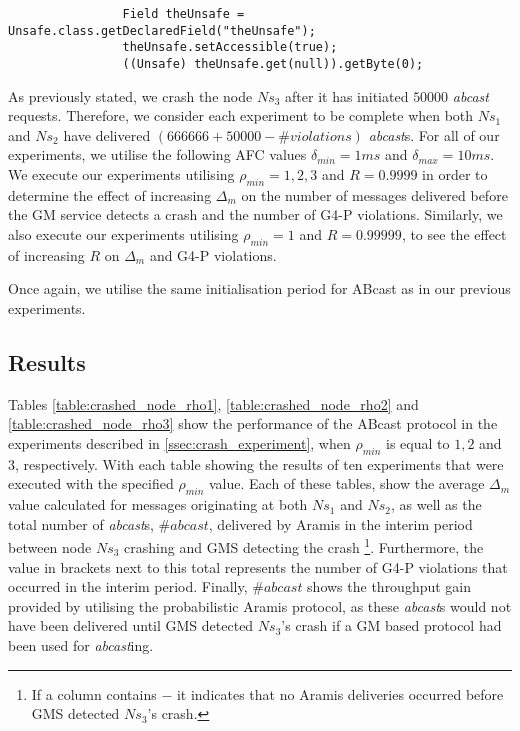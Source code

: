     \begin{minipage}{\linewidth}
	    \begin{lstlisting}
	            Field theUnsafe = Unsafe.class.getDeclaredField("theUnsafe");
	            theUnsafe.setAccessible(true);
	            ((Unsafe) theUnsafe.get(null)).getByte(0);
	    \end{lstlisting}
	\end{minipage}

    As previously stated, we crash the node $Ns_3$ after it has initiated $50000$ \emph{abcast} requests.  Therefore, we consider each experiment to be complete when both $Ns_1$ and $Ns_2$ have delivered $(666666 + 50000 - \#violations)$ \emph{abcast}s.  For all of our experiments, we utilise the following AFC values $\delta_{min} = 1ms$ and $\delta_{max} = 10ms$.  We execute our experiments utilising $\rho_{min} = 1,2,3$ and $R=0.9999$ in order to determine the effect of increasing $\Delta_m$ on the number of messages delivered before the GM service detects a crash and the number of G4-P violations.  Similarly, we also execute our experiments utilising $\rho_{min} = 1$ and $R=0.99999$, to see the effect of increasing $R$ on $\Delta_m$ and G4-P violations.  
    
    Once again, we utilise the same initialisation period for \textsf{ABcast} as in our previous experiments.  
    
    \subsection{Results}
    Tables \ref{table:crashed_node_rho1}, \ref{table:crashed_node_rho2} and \ref{table:crashed_node_rho3} show the performance of the \textsf{ABcast} protocol in the experiments described in \ref{ssec:crash_experiment}, when $\rho_{min}$ is equal to $1, 2$ and $3$, respectively.  With each table showing the results of ten experiments that were executed with the specified $\rho_{min}$ value.  Each of these tables, show the average $\Delta_m$ value calculated for messages originating at both $Ns_1$ and $Ns_2$, as well as the total number of \emph{abcast}s, $\#abcast$, delivered by \textsf{Aramis} in the interim period between node $Ns_3$ crashing and GMS detecting the crash \footnote{If a column contains $-$ it indicates that no \textsf{Aramis} deliveries occurred before GMS detected $Ns_3$'s crash.}.  Furthermore, the value in brackets next to this total represents the number of G4-P violations that occurred in the interim period.  Finally, $\#abcast$ shows the throughput gain provided by utilising the probabilistic \textsf{Aramis} protocol, as these \emph{abcast}s would not have been delivered until GMS detected $Ns_3$'s crash if a GM based protocol had been used for \emph{abcast}ing.   

